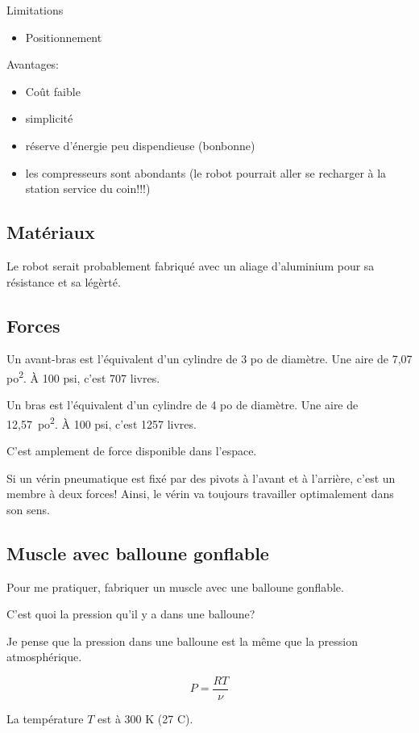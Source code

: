 \documentclass{article}
\newcommand\ala\textsuperscript{}
\begin{document}
Limitations
\begin{itemize}
    \item Positionnement
\end{itemize}

Avantages:
\begin{itemize}
    \item Coût faible
    \item simplicité
    \item réserve d'énergie peu dispendieuse (bonbonne)
    \item les compresseurs sont abondants (le robot pourrait aller se recharger à la station service du coin!!!)
\end{itemize}

\subsection{Matériaux}
Le robot serait probablement fabriqué avec un aliage d'aluminium pour sa résistance et sa légèrté.

\subsection{Forces}
Un avant-bras est l'équivalent d'un cylindre de 3 po de diamètre. Une aire de 7,07 po\ala{2}. À 100 psi, c'est 707 livres.

Un bras est l'équivalent d'un cylindre de 4 po de diamètre. Une aire de 12,57~po\ala{2}. À 100 psi, c'est 1257 livres.

C'est amplement de force disponible dans l'espace.

Si un vérin pneumatique est fixé par des pivots à l'avant et à l'arrière, c'est un membre à deux forces! Ainsi, le vérin va toujours travailler optimalement dans son sens.

\subsection{Muscle avec balloune gonflable}

Pour me pratiquer, fabriquer un muscle avec une balloune gonflable.

C'est quoi la pression qu'il y a dans une balloune?

Je pense que la pression dans une balloune est la même que la pression atmosphérique.

\[P = \frac{RT}{\nu}\]

La température $T$ est à 300 K (27 \textdegree C).
\end{document}
